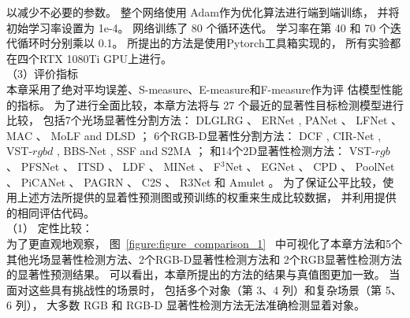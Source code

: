 以减少不必要的参数。 
整个网络使用 Adam作为优化算法进行端到端训练，
并将初始学习率设置为 1e-4。 
网络训练了 80 个循环迭代。 学习率在第 40 和 70 个迭代循环时分别乘以 0.1。 
所提出的方法是使用Pytorch工具箱实现的，
所有实验都在四个RTX 1080Ti GPU上进行。 
\\
%
%
%
%
\indent
（3）评价指标
\\
%
%
%
%
\indent
本章采用了绝对平均误差、S-measure、E-measure和F-measure作为评
估模型性能的指标。
%
%
%
%
为了进行全面比较，本章方法将与 27 个最近的显著性目标检测模型进行比较，
包括7个光场显著性分割方法：
DLGLRG 、
ERNet ,
PANet 、
LFNet 、
MAC 、 MoLF  and DLSD ；
%
%
%
%
6个RGB-D显著性分割方法：
DCF , CIR-Net , VST-$rgbd$  ,
BBS-Net     , SSF      and S2MA    ；
%
%
%
%
%
和14个2D显著性检测方法：
VST-$rgb$ 、
PFSNet 、
ITSD 、
LDF 、
MINet 、
F$^{3}$Net  、 
EGNet   、
CPD  、
PoolNet 、
PiCANet 、
PAGRN 、
C2S   、
R3Net  
和
Amulet 。
为了保证公平比较，使用上述方法所提供的显着性预测图或预训练的权重来生成比较数据，
并利用提供的相同评估代码。
\\
%
%
%
%
\indent
（1）
定性比较：
\\
%
%
%
%
\indent
为了更直观地观察，
图~\ref{figure:figure_comparison_1}~
中可视化了本章方法和5个其他光场显著性检测方法、2个RGB-D显著性检测方法和
2个RGB显著性检测方法的显著性预测结果。
可以看出，本章所提出的方法的结果与真值图更加一致。 
当面对这些具有挑战性的场景时，
包括多个对象（第 3、4 列）和复杂场景（第 5、6 列），
大多数 RGB 和 RGB-D 显著性检测方法无法准确检测显着对象。
